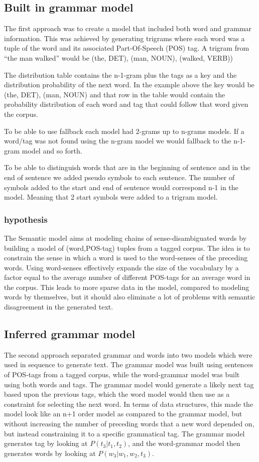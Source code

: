 \documentclass[a4paper,12pt]{article}
\begin{document}
\subsection{Built in grammar model}
The first approach was to create a model that included both word and grammar information. This was achieved by generating trigrams where each word was a tuple of the word and its associated Part-Of-Speech (POS) tag. A trigram from ``the man walked'' would be (the, DET), (man, NOUN), (walked, VERB))

The distribution table contains the n-1-gram plus the tags as a key and the distribution probability of the next word. In the example above the key would be (the, DET), (man, NOUN) and that row in the table would contain the probability distribution of each word and tag that could follow that word given the corpus.

To be able to use fallback each model had 2-grams up to n-grams models. If a word/tag was not found using the n-gram model we would fallback to the n-1-gram model and so forth.

To be able to distinguish words that are in the beginning of sentence and in the end of sentence we added pseudo symbols to each sentence. The number of symbols added to the start and end of sentence would correspond n-1 in the model. Meaning that 2 start symbols were added to a trigram model.

\subsubsection{hypothesis}
The Semantic model aims at modeling chains of sense-disambiguated words by building a model of (word,POS-tag) tuples from a tagged corpus. The idea is to constrain the sense in which a word is used to the word-senses of the preceding words. Using word-senses effectively expands the size of the vocabulary by a factor equal to the average number of different POS-tags for an average word in the corpus. This leads to more sparse data in the model, compared to modeling words by themselves, but it should also eliminate a lot of problems with semantic disagreement in the generated text.

\subsection{Inferred grammar model}
The second approach separated grammar and words into two models which were used in sequence to generate text. The grammar model was built using sentences of POS-tags from a tagged corpus, while the word-grammar model was built using both words and tags. The grammar model would generate a likely next tag based upon the previous tags, which the word model would then use as a constraint for selecting the next word. In terms of data structures, this made the model look like an n+1 order model as compared to the grammar model, but without increasing the number of preceding words that a new word depended on, but instead constraining it to a specific grammatical tag.
The grammar model generates tag by looking at $P(t_3|t_1,t_2)$, and the word-grammar model then generates words by looking at $P(w_3|w_1,w_2,t_3)$.
\end{document}
